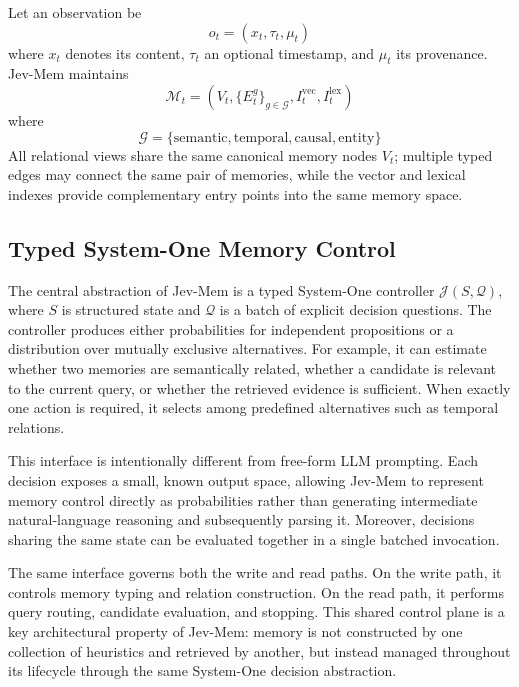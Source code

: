 \documentclass[11pt]{article}
\begin{document}
Let an observation be
\begin{equation}
o_t=(x_t,\tau_t,\mu_t)
\end{equation}
where $x_t$ denotes its content, $\tau_t$ an optional timestamp, and $\mu_t$ its provenance. Jev-Mem maintains
\begin{equation}
\mathcal{M}_t =
\left(
V_t,
\{E_t^g\}_{g\in\mathcal{G}},
I_t^{\mathrm{vec}},
I_t^{\mathrm{lex}}
\right)
\end{equation}
where
\begin{equation}
\mathcal{G}=
\{\mathrm{semantic},
\mathrm{temporal},
\mathrm{causal},
\mathrm{entity}\}
\end{equation}
All relational views share the same canonical memory nodes $V_t$; multiple typed edges may connect the same pair of memories, while the vector and lexical indexes provide complementary entry points into the same memory space.

\subsection{Typed System-One Memory Control}
\label{sec:typed-control}

The central abstraction of Jev-Mem is a typed System-One controller $\mathcal{J}(S,\mathcal{Q})$,
where $S$ is structured state and $\mathcal{Q}$ is a batch of explicit decision questions. The controller produces either probabilities for independent propositions or a distribution over mutually exclusive alternatives. For example, it can estimate whether two memories are semantically related, whether a candidate is relevant to the current query, or whether the retrieved evidence is sufficient. When exactly one action is required, it selects among predefined alternatives such as temporal relations.

This interface is intentionally different from free-form LLM prompting. Each decision exposes a small, known output space, allowing Jev-Mem to represent memory control directly as probabilities rather than generating intermediate natural-language reasoning and subsequently parsing it. Moreover, decisions sharing the same state can be evaluated together in a single batched invocation.

The same interface governs both the write and read paths. On the write path, it controls memory typing and relation construction. On the read path, it performs query routing, candidate evaluation, and stopping. This shared control plane is a key architectural property of Jev-Mem: memory is not constructed by one collection of heuristics and retrieved by another, but instead managed throughout its lifecycle through the same System-One decision abstraction.
\end{document}
